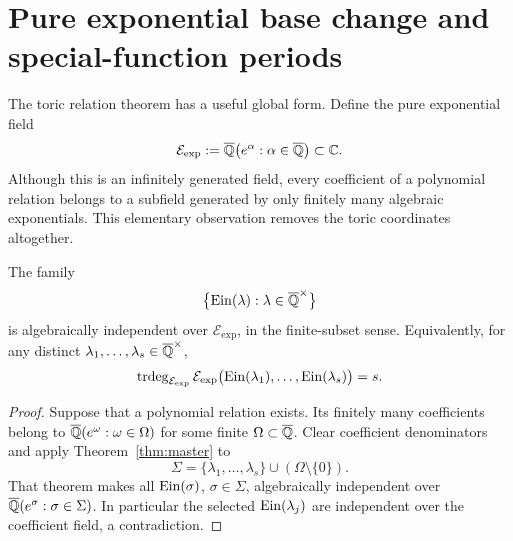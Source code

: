 
\providecommand{\Si}{\operatorname{Si}}
\providecommand{\Cin}{\operatorname{Cin}}
\providecommand{\Shi}{\operatorname{Shi}}
\providecommand{\Cinh}{\operatorname{Cinh}}
\providecommand{\Eexp}{\mathcal E_{\mathrm{exp}}}

\section{Pure exponential base change and special-function periods}
\label{sec:efunction-consequences}

The toric relation theorem has a useful global form.  Define the pure
exponential field
\begin{equation}\label{eq:pure-exponential-field}
 \Eexp:=\Qbar\bigl(e^\alpha:\alpha\in\Qbar\bigr)\subset\C.
\end{equation}
Although this is an infinitely generated field, every coefficient of a
polynomial relation belongs to a subfield generated by only finitely many
algebraic exponentials.  This elementary observation removes the toric
coordinates altogether.

\begin{theorem}\label{thm:pure-exp-base}
The family
\[
 \bigl\{\operatorname{Ein}(\lambda):\lambda\in\overline{\mathbb Q}^\times\bigr\}
\]
is algebraically independent over \(\Eexp\), in the finite-subset sense.
Equivalently, for any distinct
\(\lambda_1,\ldots,\lambda_s\in\overline{\mathbb Q}^\times\),
\[
 \operatorname{trdeg}_{\Eexp}
 \Eexp\bigl(\Ein(\lambda_1),\ldots,\Ein(\lambda_s)\bigr)=s.
\]
\end{theorem}

\begin{proof}
Suppose that a polynomial relation exists.  Its finitely many coefficients
belong to
\(\overline{\mathbb Q}(e^\omega:\omega\in\Omega)\) for some finite
\(\Omega\subset\overline{\mathbb Q}\).  Clear coefficient denominators and apply
Theorem~\ref{thm:master} to
\[
 \Sigma=\{\lambda_1,\ldots,\lambda_s\}
        \cup(\Omega\setminus\{0\}).
\]
That theorem makes all \(\operatorname{Ein}(\sigma)\), \(\sigma\in\Sigma\),
algebraically independent over
\(\overline{\mathbb Q}(e^\sigma:\sigma\in\Sigma)\).  In particular the selected
\(\operatorname{Ein}(\lambda_j)\) are independent over the coefficient field, a
contradiction.
\end{proof}

